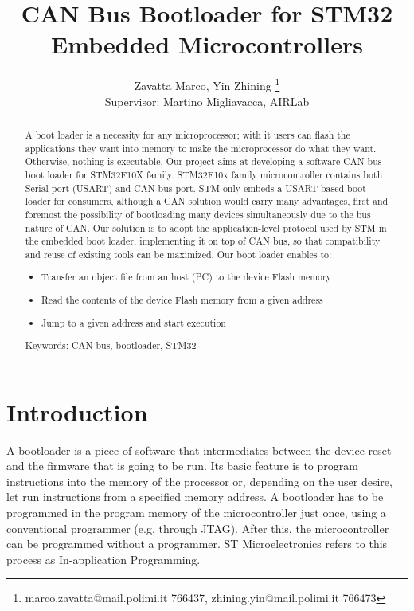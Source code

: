 \documentclass[11pt]{article} %
\title{CAN Bus Bootloader for STM32 Embedded Microcontrollers}
\author{Zavatta Marco, Yin Zhining \thanks{ marco.zavatta@mail.polimi.it 766437, zhining.yin@mail.polimi.it 766473} \\ Supervisor: Martino Migliavacca, AIRLab}
\begin{document}
\maketitle

\begin{abstract}

A boot loader is a necessity for any microprocessor; with it users can flash the applications they want into memory to make the microprocessor do what they want. Otherwise, nothing is executable. Our project aims at developing a software CAN bus boot loader for STM32F10X family. STM32F10x family microcontroller contains both Serial port (USART) and CAN bus port. STM only embeds a USART-based boot loader for consumers, although a CAN solution would carry many advantages, first and foremost the possibility of bootloading many devices simultaneously due to the bus nature of CAN. Our solution is to adopt the application-level protocol used by STM in the embedded boot loader, implementing it on top of CAN bus, so that compatibility and reuse of existing tools can be maximized.
Our boot loader enables to: 
\begin{itemize}
\item Transfer an object file from an host (PC) to the device Flash memory
\item Read the contents of the device Flash memory from a given address
\item Jump to a given address and start execution
\end{itemize}
Keywords: CAN bus, bootloader, STM32
\end{abstract}

\clearpage
\tableofcontents
\listoffigures
\clearpage


\section{Introduction}
A bootloader is a piece of software that intermediates between the device reset and the firmware that is going to be run. Its basic feature is to program instructions into the memory of the processor or, depending on the user desire, let run instructions from a specified memory address. A bootloader has to be programmed in the program memory of the microcontroller just once, using a conventional programmer (e.g. through JTAG). After this, the microcontroller can be programmed without a programmer. ST Microelectronics refers to this process as In-application Programming.
\end{document}
